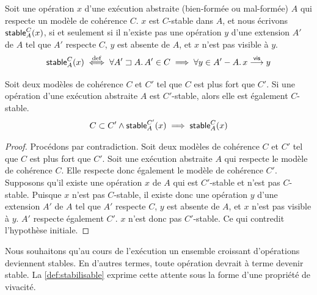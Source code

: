 \begin{definition}\label{def:stable}
Soit une opération $x$ d'une exécution abstraite (bien-formée ou mal-formée) $A$ qui respecte un modèle de cohérence $C$.
$x$ est $C$-stable dans $A$, et nous écrivons $\operatorname{\mathsf{stable}}_A^C(x)$, si et seulement si il n'existe pas une opération $y$ d'une extension $A'$ de $A$ tel que $A'$ respecte $C$, $y$ est absente de $A$, et $x$ n'est pas visible à $y$.
\begin{equation*}
  \operatorname{\mathsf{stable}}_A^C(x) \overset{\mathrm{def}}{\iff} \forall A' \sqsupset A \ldotp A' \in C \implies \forall y \in A' - A \ldotp x \overset{\mathsf{vis}}{\longrightarrow} y
\end{equation*}
\end{definition}


\begin{theorem}\label{th:stability-hierarchy}
Soit deux modèles de cohérence $C$ et $C'$ tel que $C$ est plus fort que $C'$.
Si une opération d'une exécution abstraite $A$ est $C'$-stable, alors elle est également $C$-stable.
\begin{equation*}
    C \subset C' \land \operatorname{\mathsf{stable}}_A^{C'}(x) \implies \operatorname{\mathsf{stable}}_A^{C}(x)
\end{equation*}
\end{theorem}

\begin{proof}
Procédons par contradiction.
Soit deux modèles de cohérence $C$ et $C'$ tel que $C$ est plus fort que $C'$.
Soit une exécution abstraite $A$ qui respecte le modèle de cohérence $C$.
Elle respecte donc également le modèle de cohérence $C'$.
Supposons qu'il existe une opération $x$ de $A$ qui est $C'$-stable et n'est pas $C$-stable.
Puisque $x$ n'est pas $C$-stable, il existe donc une opération $y$ d'une extension $A'$ de $A$ tel que $A'$ respecte $C$, $y$ est absente de $A$, et $x$ n'est pas visible à $y$.
$A'$ respecte également $C'$.
$x$ n'est donc pas $C'$-stable.
Ce qui contredit l'hypothèse initiale.
\end{proof}

Nous souhaitons qu'au cours de l'exécution un ensemble croissant d'opérations deviennent stables.
En d'autres termes, toute opération devrait à terme devenir stable.
La \autoref{def:stabilisable} exprime cette attente sous la forme d'une propriété de vivacité.

